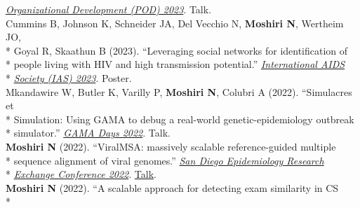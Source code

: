\documentclass[margin,line]{res}
\begin{document}
\begin{resume}
\hspace*{8mm} \href{https://podnetwork.org/48th-annual-conference/}{\textit{Organizational Development (POD) 2023}}. Talk.\\
\hspace*{4mm} Cummins B, Johnson K, Schneider JA, Del Vecchio N, \textbf{Moshiri N}, Wertheim JO,\\*
\hspace*{9mm} Goyal R, Skaathun B (2023). ``Leveraging social networks for identification of\\*
\hspace*{9mm} people living with HIV and high transmission potential.'' \href{https://www.iasociety.org/conferences/ias2023}{\textit{International AIDS}}\\*\vspace{2mm}
\hspace*{9mm}\href{https://www.iasociety.org/conferences/ias2023}{\textit{Society (IAS) 2023}}. Poster.\\
\hspace*{4mm} Mkandawire W, Butler K, Varilly P, \textbf{Moshiri N}, Colubri A (2022). ``Simulacres et\\*
\hspace*{9mm} Simulation: Using GAMA to debug a real-world genetic-epidemiology outbreak\\*\vspace{2mm}
\hspace*{8mm} simulator.'' \href{https://gama-platform.org/Gama-Days-2022/}{\textit{GAMA Days 2022}}. Talk.\\
\hspace*{4mm} \textbf{Moshiri N} (2022). ``ViralMSA: massively scalable reference-guided multiple\\*
\hspace*{9mm} sequence alignment of viral genomes.'' \href{https://publichealth.sdsu.edu/epiexchange}{\textit{San Diego Epidemiology Research}}\\*\vspace{2mm}
\hspace*{8mm} \href{https://publichealth.sdsu.edu/epiexchange}{\textit{Exchange Conference 2022}}. \href{https://docs.google.com/document/d/e/2PACX-1vTufgGn-94tzBuzs1MXideQPxZApXW0EvSHIyfKQX8xdXPvwVo1H3C4WbWSgmp67BbERnjzc_tkYqdm/pub}{Talk}.\\
\hspace*{4mm} \textbf{Moshiri N} (2022). ``A scalable approach for detecting exam similarity in CS\\*

\end{resume}
\end{document}
